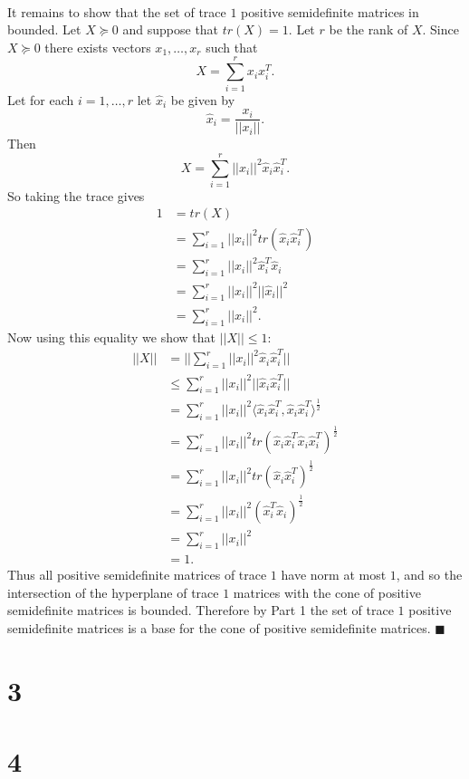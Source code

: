 \documentclass[letterpaper,12pt,oneside,onecolumn]{article}
\begin{document}
\paragraph{}
It remains to show that the set of trace $1$ positive semidefinite matrices in bounded. Let $X\succcurlyeq 0$ and suppose that $tr(X) = 1$. Let $r$ be the rank of $X$. Since $X \succcurlyeq 0$ there exists vectors $x_1, \dots, x_r$ such that
$$ X = \sum_{i=1}^r x_ix_i^T.$$
Let for each $i = 1,\dots,r$ let $\hat{x}_i$ be given by
$$ \hat{x}_i = \frac{x_i}{||x_i||}.$$
Then $$X = \sum_{i=1}^r ||x_i||^2 \hat{x}_i\hat{x}_i^T.$$
So taking the trace gives
\begin{align*}
1 &= tr(X) \\
&= \sum_{i=1}^r ||x_i||^2 tr(\hat{x}_i \hat{x}_i^T) \\
&= \sum_{i=1}^r ||x_i||^2 \hat{x}_i^T \hat{x}_i \\
&= \sum_{i=1}^r ||x_i||^2 ||\hat{x}_i||^2 \\
&= \sum_{i=1}^r ||x_i||^2.
\end{align*}
Now using this equality we show that $||X|| \leq 1$:
\begin{align*}
||X|| &= ||\sum_{i=1}^r ||x_i||^2 \hat{x}_i\hat{x}_i^T|| \\
&\leq \sum_{i=1}^r ||x_i||^2 ||\hat{x}_i\hat{x}_i^T|| \\
&= \sum_{i=1}^r ||x_i||^2 \langle \hat{x}_i \hat{x}_i^T, \hat{x}_i \hat{x}_i^T\rangle^{\frac{1}{2}} \\
&= \sum_{i=1}^r ||x_i||^2 tr(\hat{x}_i \hat{x}_i^T\hat{x}_i \hat{x}_i^T)^{\frac{1}{2}} \\
&= \sum_{i=1}^r ||x_i||^2 tr(\hat{x}_i \hat{x}_i^T)^\frac{1}{2} \\
&= \sum_{i=1}^r ||x_i||^2 (\hat{x}_i^T\hat{x}_i) ^\frac{1}{2} \\
&= \sum_{i=1}^r ||x_i||^2 \\
&= 1.
\end{align*}
Thus all positive semidefinite matrices of trace $1$ have norm at most $1$, and so the intersection of the hyperplane of trace $1$ matrices with the cone of positive semidefinite matrices is bounded. Therefore by Part 1 the set of trace $1$ positive semidefinite matrices is a base for the cone of positive semidefinite matrices. $\blacksquare$
\section*{3}

\section*{4}
\end{document}
